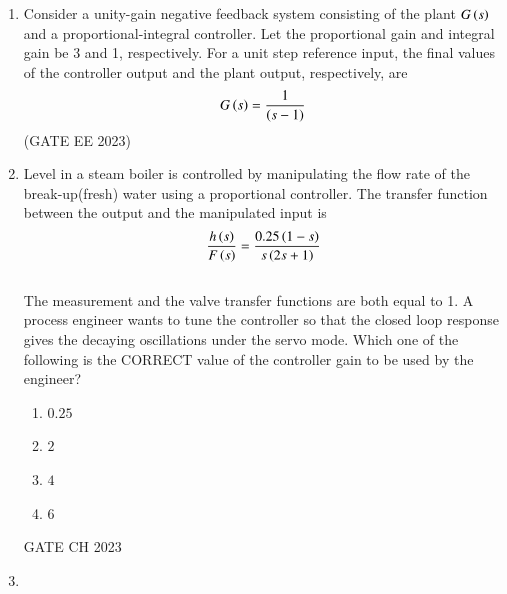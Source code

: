 \begin{enumerate}[label=\thechapter.\arabic*,ref=\thechapter.\theenumi]

\item Consider a unity-gain negative feedback system consisting of the plant $G\left(s\right)$  and a proportional-integral controller. Let the proportional gain and integral
gain be 3 and 1, respectively. For a unit step reference input, the final values of the
controller output and the plant output, respectively, are
\begin{align}
    G\left(s\right) = \frac{1}{\left(s-1\right)} \notag
\end{align}\hfill (GATE EE 2023)\\
\solution 

\newpage

\item Level  in a steam boiler is controlled by manipulating the flow rate  of the break-up(fresh) water using a proportional  controller. The transfer function between the output and the manipulated input is   \\
$$ \frac{h\left(s\right)}{F\left(s\right)}=\frac{0.25\left(1-s\right)}{s\left(2s+1\right)} $$   \\
The measurement and the valve transfer functions are both equal to 1. A process engineer wants to tune the controller so that the closed loop response gives the decaying oscillations under the servo mode. Which one of the following is the CORRECT value of the controller gain to be used by the engineer? \\
\begin{enumerate}[label=(\alph*)]
    \item $0.25$
    \item $2$
    \item $4$
    \item $6$
\end{enumerate} \hfill{GATE CH 2023} \\

\solution
\newpage
\item 


\end{enumerate}
